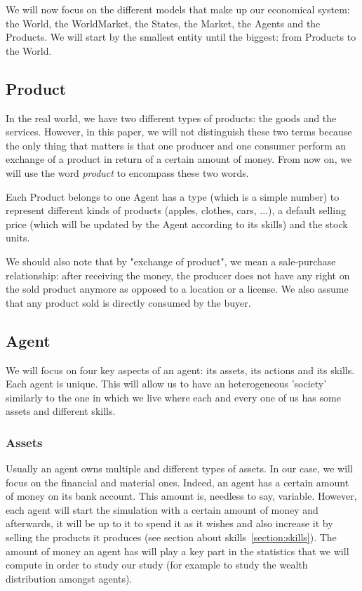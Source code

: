 We will now focus on the different models that make up our economical system: the World, the WorldMarket, the States, the Market, the Agents and the Products. We will start by the smallest entity until the biggest: from Products to the World.


\subsection{Product}\label{section:product}
In the real world, we have two different types of products: the goods and the services. However, in this paper, we will not distinguish these two terms because the only thing that matters is that one producer and one consumer perform an exchange of a product in return of a certain amount of money. From now on, we will use the word \emph{product} to encompass these two words.

Each Product belongs to one Agent has a type (which is a simple number) to represent different kinds of products (apples, clothes, cars, ...), a default selling price (which will be updated by the Agent according to its skills) and the stock units.

We should also note that by "exchange of product", we mean a sale-purchase relationship: after receiving the money, the producer does not have any right on the sold product anymore as opposed to a location or a license. We also assume that any product sold is directly consumed by the buyer.

\subsection{Agent}\label{section:agent}
We will focus on four key aspects of an agent: its assets, its actions and its skills. Each agent is unique. This will allow us to have an heterogeneous 'society' similarly to the one in which we live where each and every one of us has some assets and different skills.

    \subsubsection{Assets}\label{section:assets}
    Usually an agent owns multiple and different types of assets. In our case, we will focus on the financial and material ones. Indeed, an agent has a certain amount of money on its bank account. This amount is, needless to say, variable. 
    However, each agent will start the simulation with a certain amount of money and afterwards, it will be up to it to spend it as it wishes and also increase it by selling the products it produces (see section about skills~\ref{section:skills}). 
    The amount of money an agent has will play a key part in the statistics that we will compute in order to study our study (for example to study the wealth distribution amongst agents). 

